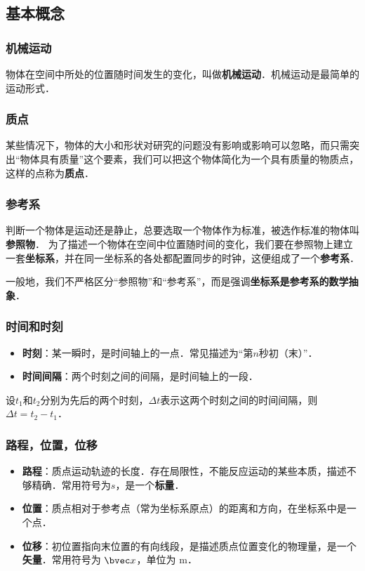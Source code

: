 

\subsection{基本概念}

\subsubsection{机械运动}
物体在空间中所处的位置随时间发生的变化，叫做\textbf{机械运动}．机械运动是最简单的运动形式．

\subsubsection{质点}
某些情况下，物体的大小和形状对研究的问题没有影响或影响可以忽略，而只需突出“物体具有质量”这个要素，我们可以把这个物体简化为一个具有质量的物质点，这样的点称为\textbf{质点}．

\subsubsection{参考系}
判断一个物体是运动还是静止，总要选取一个物体作为标准，被选作标准的物体叫\textbf{参照物}．
为了描述一个物体在空间中位置随时间的变化，我们要在参照物上建立一套\textbf{坐标系}，并在同一坐标系的各处都配置同步的时钟，这便组成了一个\textbf{参考系}．

一般地，我们不严格区分“参照物”和“参考系”，而是强调\textbf{坐标系是参考系的数学抽象}．

\subsubsection{时间和时刻}
\begin{itemize}
\item \textbf{时刻}：某一瞬时，是时间轴上的一点．常见描述为“第$n$秒初（末）”．
\item \textbf{时间间隔}：两个时刻之间的间隔，是时间轴上的一段．
\end{itemize}

设$t_1$和$t_2$分别为先后的两个时刻，$\Delta t$表示这两个时刻之间的时间间隔，则$\Delta t = t_2 - t_1$．

\subsubsection{路程，位置，位移}
\begin{itemize}
\item \textbf{路程}：质点运动轨迹的长度．存在局限性，不能反应运动的某些本质，描述不够精确．常用符号为$s$，是一个\textbf{标量}．
\item \textbf{位置}：质点相对于参考点（常为坐标系原点）的距离和方向，在坐标系中是一个点．
\item \textbf{位移}：初位置指向末位置的有向线段，是描述质点位置变化的物理量，是一个\textbf{矢量}．常用符号为 $\bvec x$，单位为 $\mathrm{m}$．
\end{itemize}

